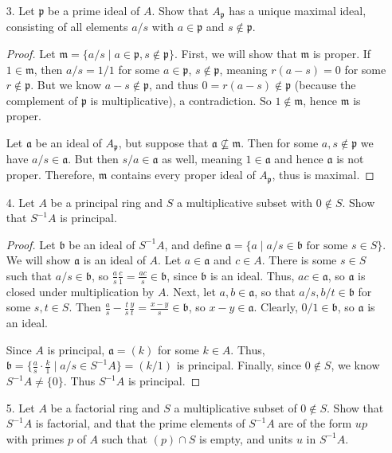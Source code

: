 \documentclass[10pt]{article}
\newcommand{\p}{\mathfrak{p}}
\renewcommand{\a}{\mathfrak{a}}
\renewcommand{\b}{\mathfrak{b}}
\newcommand{\m}{\mathfrak{m}}
\begin{document}
\begin{enumerate}
\item[3.] Let $\p$ be a prime ideal of $A$.  Show that $A_\p$ has a unique maximal ideal, consisting of all elements $a/s$ with $a \in \p$ and $s \not \in \p$.

\begin{proof}
Let $\m = \{a/s \mid a \in \p, s \not \in \p\}$.  First, we will show that $\m$ is proper.  If $1 \in \m$, then $a/s = 1/1$ for some $a \in \p$, $s \not \in \p$, meaning $r(a-s) = 0$ for some $r \not \in \p$.  But we know $a-s \not \in \p$, and thus $0=r(a-s) \not \in \p$ (because the complement of $\p$ is multiplicative), a contradiction.  So $1 \not \in \m$, hence $\m$ is proper.

Let $\a$ be an ideal of $A_\p$, but suppose that $\a \not \subseteq \m$.  Then for some $a,s \not \in \p$ we have $a/s \in \a$.  But then $s/a \in \a$ as well, meaning $1 \in \a$ and hence $\a$ is not proper.  Therefore, $\m$ contains every proper ideal of $A_\p$, thus is maximal.
\end{proof}

\item[4.] Let $A$ be a principal ring and $S$ a multiplicative subset with $0 \not \in S$.  Show that $S^{-1}A$ is principal.

\begin{proof}
Let $\b$ be an ideal of $S^{-1}A$, and define $\a = \{a \mid a / s \in \b \text{ for some } s \in S \}$.  We will show $\a$ is an ideal of $A$.  Let $a \in \a$ and $c \in A$.  There is some $s \in S$ such that $a/s \in \b$, so $\frac{a}{s} \frac{c}{1} = \frac{ac}{s} \in \b$, since $\b$ is an ideal.  Thus, $ac \in \a$, so $\a$ is closed under multiplication by $A$.  Next, let $a,b \in \a$, so that $a/s,b/t \in \b$ for some $s,t \in S$.  Then $\frac{a}{s} - \frac{t}{s}\frac{y}{t} = \frac{x-y}{s} \in \b$, so $x-y \in \a$.  Clearly, $0 / 1 \in \b$, so $\a$ is an ideal.

Since $A$ is principal, $\a = (k)$ for some $k \in A$.  Thus, $\b = \{\frac{a}{s} \cdot \frac{k}{1} \mid a/s \in S^{-1} A \} = (k/1)$ is principal.  Finally, since $0 \not \in S$, we know $S^{-1}A \neq \{0\}$.  Thus $S^{-1}A$ is principal.
\end{proof}

\item[5.] Let $A$ be a factorial ring and $S$ a multiplicative subset of $0 \not \in S$.  Show that $S^{-1}A$ is factorial, and that the prime elements of $S^{-1}A$ are of the form $up$ with primes $p$ of $A$ such that $(p) \cap S$ is empty, and units $u$ in $S^{-1}A$.


\end{enumerate}
\end{document}
